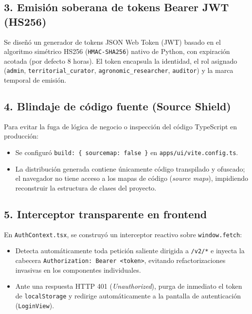 \documentclass[11pt,a4paper]{article}
\begin{document}
\subsection{3. Emisi\'on soberana de tokens Bearer JWT (HS256)}
Se dise\~n\'o un generador de tokens JSON Web Token (JWT) basado en el algoritmo sim\'etrico HS256 (\texttt{HMAC-SHA256}) nativo de Python, con expiraci\'on acotada (por defecto 8 horas). El token encapsula la identidad, el rol asignado (\texttt{admin}, \texttt{territorial\_curator}, \texttt{agronomic\_researcher}, \texttt{auditor}) y la marca temporal de emisi\'on.

\subsection{4. Blindaje de c\'odigo fuente (Source Shield)}
Para evitar la fuga de l\'ogica de negocio o inspecci\'on del c\'odigo TypeScript en producci\'on:
\begin{itemize}[leftmargin=*]
    \item Se configur\'o \texttt{build: \{ sourcemap: false \}} en \texttt{apps/ui/vite.config.ts}.
    \item La distribuci\'on generada contiene \'unicamente c\'odigo transpilado y ofuscado; el navegador no tiene acceso a los mapas de c\'odigo (\textit{source maps}), impidiendo reconstruir la estructura de clases del proyecto.
\end{itemize}

\subsection{5. Interceptor transparente en frontend}
En \texttt{AuthContext.tsx}, se construy\'o un interceptor reactivo sobre \texttt{window.fetch}:
\begin{itemize}[leftmargin=*]
    \item Detecta autom\'aticamente toda petici\'on saliente dirigida a \texttt{/v2/*} e inyecta la cabecera \texttt{Authorization: Bearer <token>}, evitando refactorizaciones invasivas en los componentes individuales.
    \item Ante una respuesta HTTP 401 (\textit{Unauthorized}), purga de inmediato el token de \texttt{localStorage} y redirige autom\'aticamente a la pantalla de autenticaci\'on (\texttt{LoginView}).
\end{itemize}
\end{document}
